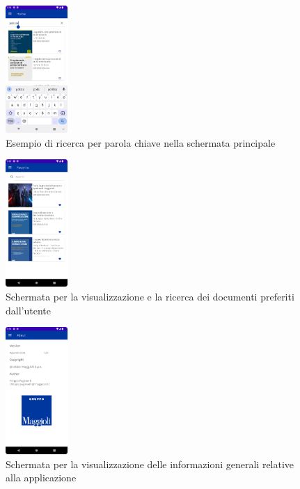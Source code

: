 \begin{multicols}{3}
            \begin{figure}[H]
                \includegraphics[width=0.21\textwidth]{img/ricerca.png}
                \caption{Esempio di ricerca per parola chiave nella schermata principale}
                \label{ricerca}
            \end{figure}

            \begin{figure}[H]
                \includegraphics[width=0.21\textwidth]{img/preferiti.png}
                \caption{Schermata per la visualizzazione e la ricerca dei documenti preferiti dall'utente}
                \label{preferiti}
            \end{figure}

            \begin{figure}[H]
                \includegraphics[width=0.21\textwidth]{img/about.png}
                \caption{Schermata per la visualizzazione delle informazioni generali relative alla applicazione}
                \label{about}
            \end{figure}


\end{multicols}
